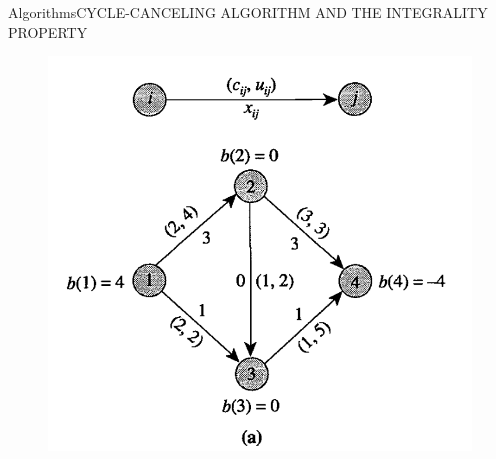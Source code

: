 \documentclass{beamer}
\begin{document}
\begin{frame}{Algorithms}{CYCLE-CANCELING ALGORITHM AND THE
  INTEGRALITY PROPERTY}
\begin{figure}[h!t]
\centering
\includegraphics[scale = 0.25]{figura1cancelingcycle.png}
\end{figure}
\end{frame}
\end{document}
